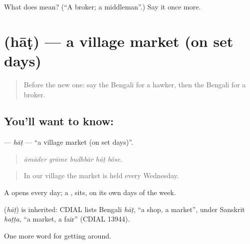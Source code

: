 \begin{tcolorbox}[breakable,colback=teal!4,colframe=teal!35!black,title={Before you move on}]
What does  mean? (\textquotedblleft{}A broker; a middleman\textquotedblright{}.) Say it once more.
\end{tcolorbox}
\section[\texorpdfstring{\bn{হাট} (hāṭ)}{হাট (hāṭ)}]{ (hāṭ) — a village market (on set days)}

\label{lesson:BN-C420-hat}



\begin{quote}
Before the new one: say the Bengali for a hawker, then the Bengali for a broker.
\end{quote}

\subsection*{You'll want to know: }
\textbf{} — \emph{hāṭ} — \textquotedblleft{}a village market (on set days)\textquotedblright{}.

\begin{quote}
    
\end{quote}

\begin{quote}
\emph{āmāder grāme budhbār hāṭ bôse.}
\end{quote}

\begin{quote}
In our village the market is held every Wednesday.
\end{quote}

A  opens every day; a  , sits, on its own days of the week.

\begin{cousinweb}
\textbf{} (\emph{hāṭ}) is inherited: CDIAL lists Bengali \emph{hāṭ}, \textquotedblleft{}a shop, a market\textquotedblright{}, under Sanskrit \emph{haṭṭa}, \textquotedblleft{}a market, a fair\textquotedblright{} (CDIAL 13944).
\end{cousinweb}

\begin{grammarlens}[title={What you've built}]
One more word for getting around.
\end{grammarlens}

